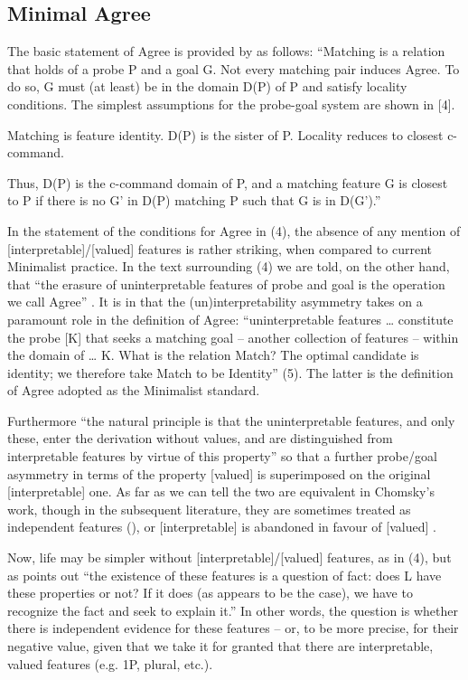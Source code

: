 \documentclass[output=paper]{langsci/langscibook}
\begin{document}
\subsection{Minimal Agree} %

The basic statement of Agree is provided by \citet[122]{Chomsky2000} as follows: “Matching is a relation that holds of a probe P and a goal G. Not every matching pair induces Agree. To do so, G must (at least) be in the domain D(P) of P and satisfy locality conditions. The simplest assumptions for the probe-goal system are shown in [4].

\ea%
    \label{ex:manzini:4}
    \ea Matching is feature identity.
    \ex D(P) is the sister of P.
    \ex Locality reduces to closest c-command. 
\z
\z

Thus, D(P) is the c-command domain of P, and a matching feature G is closest to P if there is no G' in D(P) matching P such that G is in D(G').” 

In the statement of the conditions for Agree in (4), the absence of any mention of [interpretable]/[valued] features is rather striking, when compared to current Minimalist practice. In the text surrounding (4) we are told, on the other hand, that “the erasure of uninterpretable features of probe and goal is the operation we call Agree” \citep[122]{Chomsky2000}. It is in \citet{Chomsky2001} that the (un)interpretability asymmetry takes on a paramount role in the definition of Agree: “uninterpretable features … constitute the probe [K] that seeks a matching goal – another collection of features – within the domain of … K. What is the relation Match? The optimal candidate is identity; we therefore take Match to be Identity” (5). The latter is the definition of Agree adopted as the Minimalist standard.

Furthermore “the natural principle is that the uninterpretable features, and only these, enter the derivation without values, and are distinguished from interpretable features by virtue of this property” so that a further probe/goal asymmetry in terms of the property [valued] is superimposed on the original [interpretable] one. As far as we can tell the two are equivalent in Chomsky’s work, though in the subsequent literature, they are sometimes treated as independent features (\citealt{Pesetsky2007}), or [interpretable] is abandoned in favour of [valued] \citep{Preminger2014}. 

 Now, life may be simpler without [interpretable]/[valued] features, as in (4), but as \citet[4]{Chomsky2001} points out “the existence of these features is a question of fact: does L have these properties or not? If it does (as appears to be the case), we have to recognize the fact and seek to explain it.” In other words, the question is whether there is independent evidence for these features – or, to be more precise, for their negative value, given that we take it for granted that there are interpretable, valued features (e.g. 1P, plural, etc.).
\end{document}
